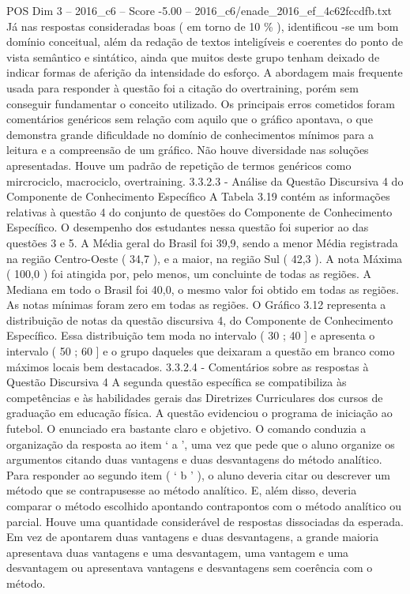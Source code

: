 \begin{textsample}{POS Dim 3 – 2016\_c6 – Score -5.00 – 2016\_c6/enade\_2016\_ef\_4c62fccdfb.txt}
Já nas respostas consideradas boas ( em torno de 10 \% ), identificou -se um bom domínio conceitual, além da redação de textos inteligíveis e coerentes do ponto de vista semântico e sintático, ainda que muitos deste grupo tenham deixado de indicar formas de aferição da intensidade do esforço.
A abordagem mais frequente usada para responder à questão foi a citação do overtraining, porém sem conseguir fundamentar o conceito utilizado.
Os principais erros cometidos foram comentários genéricos sem relação com aquilo que o gráfico apontava, o que demonstra grande dificuldade no domínio de conhecimentos mínimos para a leitura e a compreensão de um gráfico.
Não houve diversidade nas soluções apresentadas.
Houve um padrão de repetição de termos genéricos como mircrociclo, macrociclo, overtraining. 3.3.2.3 - Análise da Questão Discursiva 4 do Componente de Conhecimento Específico A Tabela 3.19 contém as informações relativas à questão 4 do conjunto de questões do Componente de Conhecimento Específico.
O desempenho dos estudantes nessa questão foi superior ao das questões 3 e 5.
A Média geral do Brasil foi 39,9, sendo a menor Média registrada na região Centro-Oeste ( 34,7 ), e a maior, na região Sul ( 42,3 ).
A nota Máxima ( 100,0 ) foi atingida por, pelo menos, um concluinte de todas as regiões.
A Mediana em todo o Brasil foi 40,0, o mesmo valor foi obtido em todas as regiões.
As notas mínimas foram zero em todas as regiões.
O Gráfico 3.12 representa a distribuição de notas da questão discursiva 4, do Componente de Conhecimento Específico.
Essa distribuição tem moda no intervalo ( 30 ; 40 ] e apresenta o intervalo ( 50 ; 60 ] e o grupo daqueles que deixaram a questão em branco como máximos locais bem destacados. 3.3.2.4 - Comentários sobre as respostas à Questão Discursiva 4 A segunda questão específica se compatibiliza às competências e às habilidades gerais das Diretrizes Curriculares dos cursos de graduação em educação física.
A questão evidenciou o programa de iniciação ao futebol.
O enunciado era bastante claro e objetivo.
O comando conduzia a organização da resposta ao item ‘ a ’, uma vez que pede que o aluno organize os argumentos citando duas vantagens e duas desvantagens do método analítico.
Para responder ao segundo item ( ‘ b ’ ), o aluno deveria citar ou descrever um método que se contrapusesse ao método analítico.
E, além disso, deveria comparar o método escolhido apontando contrapontos com o método analítico ou parcial.
Houve uma quantidade considerável de respostas dissociadas da esperada.
Em vez de apontarem duas vantagens e duas desvantagens, a grande maioria apresentava duas vantagens e uma desvantagem, uma vantagem e uma desvantagem ou apresentava vantagens e desvantagens sem coerência com o método.

\end{textsample}
